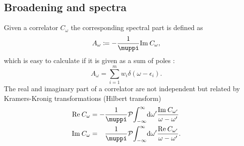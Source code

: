 \subsection{Broadening and spectra}

Given a correlator $C_\omega$ the corresponding spectral part is defined as
\begin{equation}
    A_\omega \coloneq -\frac{1}{\muppi}\Im C_\omega,
\end{equation}
which is easy to calculate if it is given as a sum of poles :
\begin{equation}
    A_\omega = \sum_{i=1}^m w_i \delta(\omega - \epsilon_i).
    \label{eq:spectral-sum}
\end{equation}
The real and imaginary part of a correlator are not independent
but related by Kramers-Kronig transformations (Hilbert transform)
\begin{subequations}
    \begin{align}
        \Re C_\omega
         & =
        - \frac{1}{\muppi} \mathcal{P}\! \int_{-\infty}^\infty\! \md\omega'
        \frac{\Im C_{\omega'}}{\omega - \omega'}
        \label{eq:kramers-kroneg-real} \\
        \Im C_\omega
         & =
        \phantom{-} \frac{1}{\muppi} \mathcal{P}\! \int_{-\infty}^\infty\! \md\omega'
        \frac{\Re C_{\omega'}}{\omega - \omega'}.
        \label{eq:kramers-kronig-imag}
    \end{align}
\end{subequations}


